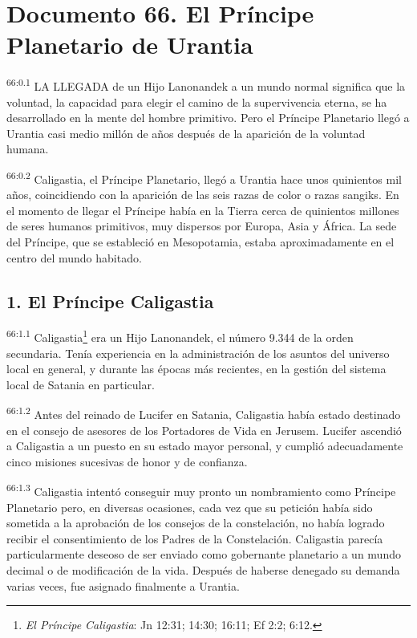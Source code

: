 \chapter{Documento 66. El Príncipe Planetario de Urantia}
\par
\textsuperscript{66:0.1} LA LLEGADA de un Hijo Lanonandek a un mundo normal significa que la voluntad, la capacidad para elegir el camino de la supervivencia eterna, se ha desarrollado en la mente del hombre primitivo. Pero el Príncipe Planetario llegó a Urantia casi medio millón de años después de la aparición de la voluntad humana.

\par
\textsuperscript{66:0.2} Caligastia, el Príncipe Planetario, llegó a Urantia hace unos quinientos mil años, coincidiendo con la aparición de las seis razas de color o razas sangiks. En el momento de llegar el Príncipe había en la Tierra cerca de quinientos millones de seres humanos primitivos, muy dispersos por Europa, Asia y África. La sede del Príncipe, que se estableció en Mesopotamia, estaba aproximadamente en el centro del mundo habitado.

\section*{1. El Príncipe Caligastia}
\par
\textsuperscript{66:1.1} Caligastia\footnote{\textit{El Príncipe Caligastia}: Jn 12:31; 14:30; 16:11; Ef 2:2; 6:12.} era un Hijo Lanonandek, el número 9.344 de la orden secundaria. Tenía experiencia en la administración de los asuntos del universo local en general, y durante las épocas más recientes, en la gestión del sistema local de Satania en particular.

\par
\textsuperscript{66:1.2} Antes del reinado de Lucifer en Satania, Caligastia había estado destinado en el consejo de asesores de los Portadores de Vida en Jerusem. Lucifer ascendió a Caligastia a un puesto en su estado mayor personal, y cumplió adecuadamente cinco misiones sucesivas de honor y de confianza.

\par
\textsuperscript{66:1.3} Caligastia intentó conseguir muy pronto un nombramiento como Príncipe Planetario pero, en diversas ocasiones, cada vez que su petición había sido sometida a la aprobación de los consejos de la constelación, no había logrado recibir el consentimiento de los Padres de la Constelación. Caligastia parecía particularmente deseoso de ser enviado como gobernante planetario a un mundo decimal o de modificación de la vida. Después de haberse denegado su demanda varias veces, fue asignado finalmente a Urantia.

